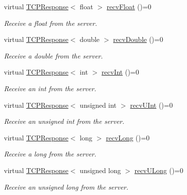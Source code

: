 \begin{DoxyCompactItemize}
virtual \hyperlink{class_rad_jav_1_1_networking_1_1_t_c_p_response}{T\+C\+P\+Response}$<$ float $>$ \hyperlink{class_rad_jav_1_1_networking_1_1_tcpip_client_a9ae3705885dc01ba454eda88c6de2d7c}{recv\+Float} ()=0
\begin{DoxyCompactList}\small\item\em Receive a float from the server. \end{DoxyCompactList}\item 
virtual \hyperlink{class_rad_jav_1_1_networking_1_1_t_c_p_response}{T\+C\+P\+Response}$<$ double $>$ \hyperlink{class_rad_jav_1_1_networking_1_1_tcpip_client_aa21cdd752ab372f5160252b15d8c6b44}{recv\+Double} ()=0
\begin{DoxyCompactList}\small\item\em Receive a double from the server. \end{DoxyCompactList}\item 
virtual \hyperlink{class_rad_jav_1_1_networking_1_1_t_c_p_response}{T\+C\+P\+Response}$<$ int $>$ \hyperlink{class_rad_jav_1_1_networking_1_1_tcpip_client_aefee5d91c6c7e05e5942557f992b3720}{recv\+Int} ()=0
\begin{DoxyCompactList}\small\item\em Receive an int from the server. \end{DoxyCompactList}\item 
virtual \hyperlink{class_rad_jav_1_1_networking_1_1_t_c_p_response}{T\+C\+P\+Response}$<$ unsigned int $>$ \hyperlink{class_rad_jav_1_1_networking_1_1_tcpip_client_a02e9cfcd958b6600dc03eee911fbfe5e}{recv\+U\+Int} ()=0
\begin{DoxyCompactList}\small\item\em Receive an unsigned int from the server. \end{DoxyCompactList}\item 
virtual \hyperlink{class_rad_jav_1_1_networking_1_1_t_c_p_response}{T\+C\+P\+Response}$<$ long $>$ \hyperlink{class_rad_jav_1_1_networking_1_1_tcpip_client_ab8d72a09dfd06b4043980b882f6950a5}{recv\+Long} ()=0
\begin{DoxyCompactList}\small\item\em Receive a long from the server. \end{DoxyCompactList}\item 
virtual \hyperlink{class_rad_jav_1_1_networking_1_1_t_c_p_response}{T\+C\+P\+Response}$<$ unsigned long $>$ \hyperlink{class_rad_jav_1_1_networking_1_1_tcpip_client_a2ef3d2270c9ddc1f21823fc240fa50d7}{recv\+U\+Long} ()=0
\begin{DoxyCompactList}\small\item\em Receive an unsigned long from the server. \end{DoxyCompactList}\item 

\end{DoxyCompactItemize}
